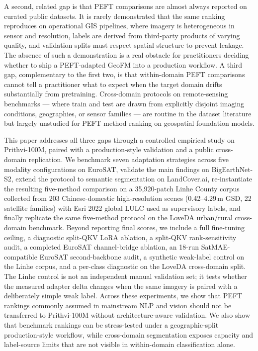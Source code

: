 A second, related gap is that PEFT comparisons are almost always reported on curated public datasets. It is rarely demonstrated that the same ranking reproduces on operational GIS pipelines, where imagery is heterogeneous in sensor and resolution, labels are derived from third-party products of varying quality, and validation splits must respect spatial structure to prevent leakage. The absence of such a demonstration is a real obstacle for practitioners deciding whether to ship a PEFT-adapted GeoFM into a production workflow. A third gap, complementary to the first two, is that within-domain PEFT comparisons cannot tell a practitioner what to expect when the target domain drifts substantially from pretraining. Cross-domain protocols on remote-sensing benchmarks --- where train and test are drawn from explicitly disjoint imaging conditions, geographies, or sensor families --- are routine in the dataset literature but largely unstudied for PEFT method ranking on geospatial foundation models.

This paper addresses all three gaps through a controlled empirical study on Prithvi-100M, paired with a production-style validation and a public cross-domain replication. We benchmark seven adaptation strategies across five modality configurations on EuroSAT, validate the main findings on BigEarthNet-S2, extend the protocol to semantic segmentation on LandCover.ai, re-instantiate the resulting five-method comparison on a 35{,}920-patch Linhe County corpus collected from 203 Chinese-domestic high-resolution scenes (0.42--4.29\,m GSD, 22 satellite families) with Esri 2022 global LULC used as supervisory labels, and finally replicate the same five-method protocol on the LoveDA urban/rural cross-domain benchmark. Beyond reporting final scores, we include a full fine-tuning ceiling, a diagnostic split-QKV LoRA ablation, a split-QKV rank-sensitivity audit, a completed EuroSAT channel-bridge ablation, an 18-run SatMAE-compatible EuroSAT second-backbone audit, a synthetic weak-label control on the Linhe corpus, and a per-class diagnostic on the LoveDA cross-domain split. The Linhe control is not an independent manual validation set; it tests whether the measured adapter delta changes when the same imagery is paired with a deliberately simple weak label. Across these experiments, we show that PEFT rankings commonly assumed in mainstream NLP and vision should not be transferred to Prithvi-100M without architecture-aware validation. We also show that benchmark rankings can be stress-tested under a geographic-split production-style workflow, while cross-domain segmentation exposes capacity and label-source limits that are not visible in within-domain classification alone.

